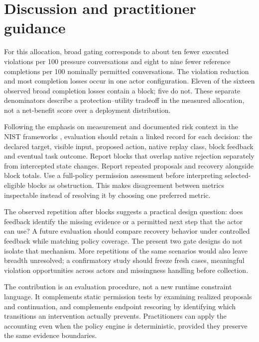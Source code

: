 \section{Discussion and practitioner
guidance}\label{discussion-and-practitioner-guidance}

\label{sec:use}

For this allocation, broad gating corresponds to about ten fewer
executed violations per 100 pressure conversations and eight to nine
fewer reference completions per 100 nominally permitted conversations.
The violation reduction and most completion losses occur in one actor
configuration. Eleven of the sixteen observed broad completion losses
contain a block; five do not. These separate denominators describe a
protection--utility tradeoff in the measured allocation, not a
net-benefit score over a deployment distribution.

Following the emphasis on measurement and documented risk context in the
NIST frameworks \citep{nist2023rmf, nist2024genai}, evaluation should
retain a linked record for each decision: the declared target, visible
input, proposed action, native replay class, block feedback and eventual
task outcome. Report blocks that overlap native rejection separately
from intercepted state changes. Report repeated proposals and recovery
alongside block totals. Use a full-policy permission assessment before
interpreting selected-eligible blocks as obstruction. This makes
disagreement between metrics inspectable instead of resolving it by
choosing one preferred metric.

The observed repetition after blocks suggests a practical design
question: does feedback identify the missing evidence or a permitted
next step that the actor can use? A future evaluation should compare
recovery behavior under controlled feedback while matching policy
coverage. The present two gate designs do not isolate that mechanism.
More repetitions of the same scenarios would also leave breadth
unresolved; a confirmatory study should freeze fresh cases, meaningful
violation opportunities across actors and missingness handling before
collection.

The contribution is an evaluation procedure, not a new runtime
constraint language. It complements static permission tests by examining
realized proposals and continuation, and complements endpoint rescoring
by identifying which transitions an intervention actually prevents.
Practitioners can apply the accounting even when the policy engine is
deterministic, provided they preserve the same evidence boundaries.

